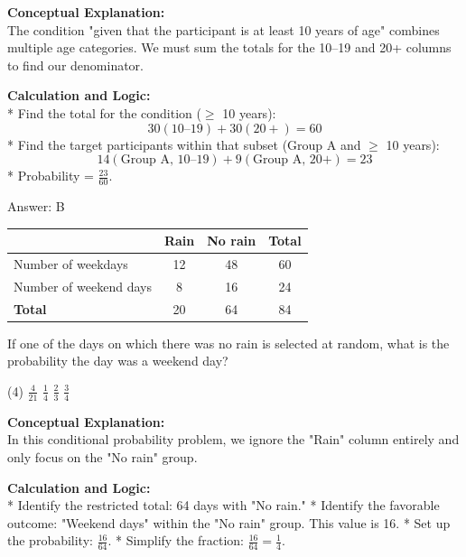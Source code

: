 \documentclass[11pt,paper=a4,answers]{exam}
\begin{document}
\begin{questions}
\begin{solution}
\textbf{Conceptual Explanation:} \\
The condition "given that the participant is at least 10 years of age" combines multiple age categories. We must sum the totals for the 10--19 and 20+ columns to find our denominator.

\vspace{30pt}

\textbf{Calculation and Logic:} \\
* Find the total for the condition ($\ge$ 10 years):
\[ 30 (10\text{--}19) + 30 (20+) = 60 \]
* Find the target participants within that subset (Group A and $\ge$ 10 years):
\[ 14 (\text{Group A, 10--19}) + 9 (\text{Group A, 20+}) = 23 \]
* Probability = $\frac{23}{60}$.

\vspace{30pt}

Answer: \colorbox{yellow!100}{B}
\end{solution}

\vspace{60pt}

\question
\begin{center}
\begin{tabular}{|l|c|c|c|}
\hline
 & \textbf{Rain} & \textbf{No rain} & \textbf{Total} \\ \hline
Number of weekdays & 12 & 48 & 60 \\ \hline
Number of weekend days & 8 & 16 & 24 \\ \hline
\textbf{Total} & 20 & 64 & 84 \\ \hline
\end{tabular}
\end{center}
If one of the days on which there was no rain is selected at random, what is the probability the day was a weekend day?
\begin{tasks}(4)
    \task $\frac{4}{21}$
    \task $\frac{1}{4}$
    \task $\frac{2}{3}$
    \task $\frac{3}{4}$
\end{tasks}

\begin{solution}
\textbf{Conceptual Explanation:} \\
In this conditional probability problem, we ignore the "Rain" column entirely and only focus on the "No rain" group.

\vspace{30pt}

\textbf{Calculation and Logic:} \\
* Identify the restricted total: 64 days with "No rain."
* Identify the favorable outcome: "Weekend days" within the "No rain" group. This value is 16.
* Set up the probability: $\frac{16}{64}$.
* Simplify the fraction: $\frac{16}{64} = \frac{1}{4}$.


\end{solution}
\end{questions}
\end{document}
